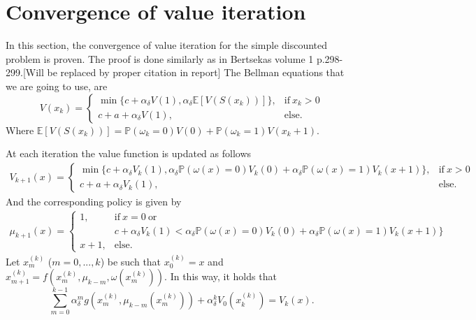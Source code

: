 

\chapter{Convergence of value iteration}
In this section, the convergence of value iteration for the simple discounted problem is proven.
The proof is done similarly as in Bertsekas volume 1 p.298-299.[Will be replaced by proper citation in report]
The Bellman equations that we are going to use, are
\begin{equation}
V(x_k)=\begin{cases}
\min\{c+\alpha_\delta V(1),\alpha_\delta \mathbb{E}[V(S(x_k))]\},&\text{if}\ x_k>0 \\
c+a+\alpha_\delta V(1),&\text{else.}
\end{cases}
\end{equation}
Where $\mathbb{E}[V(S(x_k))]=\mathbb{P}(\omega_k=0)V(0)+\mathbb{P}(\omega_k=1)V(x_k+1)$.

At each iteration the value function is updated as follows
\begin{equation}
\begin{split}
V_{k+1}(x)=\begin{cases}
\min\{c+\alpha_\delta V_k(1),\alpha_\delta\mathbb{P}(\omega(x)=0)V_k(0)+\alpha_\delta\mathbb{P}(\omega(x)=1)V_k(x+1)\},&\text{if}\ x>0 \\
c+a+\alpha_\delta V_k(1),&\text{else.}
\end{cases}
\end{split}
\end{equation}
And the corresponding policy is given by
\begin{equation}
\begin{split}
\mu_{k+1}(x)=\begin{cases}
1,&\text{if}\ x=0\ \text{or}\\&c+\alpha_\delta V_k(1)<\alpha_\delta\mathbb{P}(\omega(x)=0)V_k(0)+\alpha_\delta\mathbb{P}(\omega(x)=1)V_k(x+1)\} \\
x+1,&\text{else.}
\end{cases}
\end{split}
\end{equation}
Let $x_m^{(k)}$ ($m=0,...,k$) be such that $x_0^{(k)}=x$ and $x_{m+1}^{(k)}=f(x_m^{(k)},\mu_{k-m},\omega(x_m^{(k)}))$.
In this way, it holds that
$$
\sum\limits_{m=0}^{k-1}\alpha_\delta^mg(x_m^{(k)},\mu_{k-m}(x_m^{(k)}))+\alpha_\delta^k V_0(x_{k}^{(k)})=V_k(x).
$$

